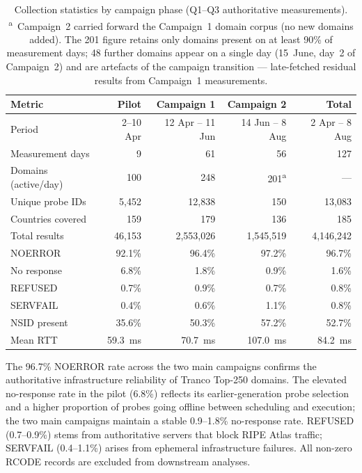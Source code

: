 \begin{table}[H]
\centering
\small
\begin{tabular}{l r r r r}
\toprule
\textbf{Metric} & \textbf{Pilot} & \textbf{Campaign 1} & \textbf{Campaign 2} & \textbf{Total} \\
\midrule
Period               & 2--10 Apr   & 12 Apr -- 11 Jun & 14 Jun -- 8 Aug & 2 Apr -- 8 Aug \\
Measurement days     & 9           & 61               & 56              & 127            \\
Domains (active/day) & 100         & 248              & 201\textsuperscript{a} & ---       \\
Unique probe IDs     & 5,452       & 12,838           & 150             & 13,083         \\
Countries covered    & 159         & 179              & 136             & 185            \\
Total results        & 46,153      & 2,553,026        & 1,545,519       & 4,146,242      \\
\midrule
NOERROR              & 92.1\%      & 96.4\%           & 97.2\%          & 96.7\%         \\
No response          & 6.8\%       & 1.8\%            & 0.9\%           & 1.6\%          \\
REFUSED              & 0.7\%       & 0.9\%            & 0.7\%           & 0.8\%          \\
SERVFAIL             & 0.4\%       & 0.6\%            & 1.1\%           & 0.8\%          \\
\ac{NSID} present    & 35.6\%      & 50.3\%           & 57.2\%          & 52.7\%         \\
Mean \ac{RTT}        & 59.3~ms     & 70.7~ms          & 107.0~ms        & 84.2~ms        \\
\bottomrule
\end{tabular}
\caption{Collection statistics by campaign phase (Q1--Q3 authoritative measurements). \textsuperscript{a}~Campaign~2 carried forward the Campaign~1 domain corpus (no new domains added). The 201 figure retains only domains present on at least 90\% of measurement days; 48 further domains appear on a single day (15~June, day~2 of Campaign~2) and are artefacts of the campaign transition --- late-fetched residual results from Campaign~1 measurements.}
\label{tab:4.1}
\end{table}

The 96.7\% NOERROR rate across the two main campaigns confirms the authoritative infrastructure reliability of Tranco Top-250 domains. The elevated no-response rate in the pilot (6.8\%) reflects its earlier-generation probe selection and a higher proportion of probes going offline between scheduling and execution; the two main campaigns maintain a stable 0.9--1.8\% no-response rate. REFUSED (0.7--0.9\%) stems from authoritative servers that block RIPE Atlas traffic; SERVFAIL (0.4--1.1\%) arises from ephemeral infrastructure failures. All non-zero RCODE records are excluded from downstream analyses.

